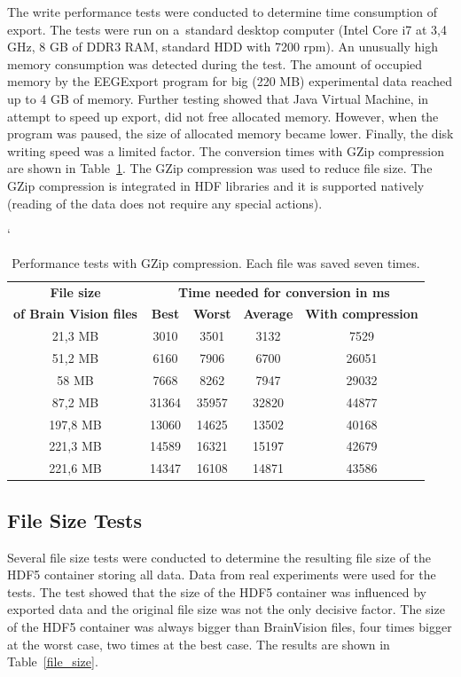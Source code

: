 \documentclass[conference]{IEEEtran}
\begin{document}
The write performance tests were conducted to determine time consumption of export. The tests were run on a~standard desktop computer (Intel Core i7 at 3,4 GHz, 8 GB of DDR3 RAM, standard HDD with 7200 rpm). An unusually high memory consumption was detected during the test. The amount of occupied memory by the EEGExport program for big (220 MB) experimental data reached up to 4 GB of memory. Further testing showed that Java Virtual Machine, in attempt to speed up export, did not free allocated memory. However, when the program was paused, the size of allocated memory became lower. Finally, the disk writing speed was a limited factor. The conversion times with GZip compression are shown in Table~\ref{speed_test}. The GZip compression was used to reduce file size. The GZip compression is integrated in HDF libraries and it is supported natively (reading of the data does not require any special actions).

\begin{table}
	\catcode`
	\centering
	\caption{Performance tests with GZip compression. Each file was saved seven times.}
	\label{speed_test}
	\begin{tabular}{|c|c|c|c|c|}
		\hline
		\textbf{File size} & \multicolumn{4}{c|}{\textbf{Time needed for conversion in ms}}\\
		\cline{2-5}		
		\textbf{ of Brain Vision files}	&\textbf{Best} & \textbf{Worst} & \textbf{Average} & \textbf{With compression}\\
		\hline
		\hline 21,3 MB & 3010 & 3501  & 3132& 7529 \\ 	
		\hline 51,2 MB & 6160  & 7906 & 6700 & 26051\\
		\hline 58 MB & 7668 &  8262 &  7947& 29032\\
		\hline 87,2 MB & 31364 & 35957 & 32820& 44877\\
		\hline 197,8 MB & 13060  & 14625 &  13502& 40168\\ 		
		\hline 221,3 MB & 14589 & 16321 & 15197& 42679 \\
		\hline 221,6 MB & 14347  & 16108 & 14871& 43586\\
		\hline
	\end{tabular}
\end{table}


\subsection{File Size Tests}
Several file size tests were conducted to determine the resulting file size of the HDF5 container storing all data. Data from real experiments were used for the tests. The test showed that the size of the HDF5 container was influenced by exported data and the original file size was not the only decisive factor. The size of the HDF5 container was always bigger than BrainVision files, four times bigger at the worst case, two times at the best case. The results are shown in Table~\ref{file_size}.
\end{document}
